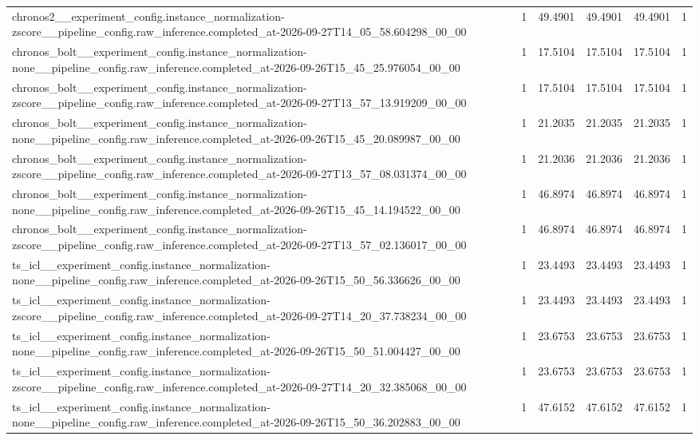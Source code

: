 \begin{tabular}{llllll}
chronos2\_\_experiment\_config.instance\_normalization-zscore\_\_pipeline\_config.raw\_inference.completed\_at-2026-09-27T14\_05\_58.604298\_00\_00 & 1 & 49.4901 & 49.4901 & 49.4901 & 1 \\
chronos\_bolt\_\_experiment\_config.instance\_normalization-none\_\_pipeline\_config.raw\_inference.completed\_at-2026-09-26T15\_45\_25.976054\_00\_00 & 1 & 17.5104 & 17.5104 & 17.5104 & 1 \\
chronos\_bolt\_\_experiment\_config.instance\_normalization-zscore\_\_pipeline\_config.raw\_inference.completed\_at-2026-09-27T13\_57\_13.919209\_00\_00 & 1 & 17.5104 & 17.5104 & 17.5104 & 1 \\
chronos\_bolt\_\_experiment\_config.instance\_normalization-none\_\_pipeline\_config.raw\_inference.completed\_at-2026-09-26T15\_45\_20.089987\_00\_00 & 1 & 21.2035 & 21.2035 & 21.2035 & 1 \\
chronos\_bolt\_\_experiment\_config.instance\_normalization-zscore\_\_pipeline\_config.raw\_inference.completed\_at-2026-09-27T13\_57\_08.031374\_00\_00 & 1 & 21.2036 & 21.2036 & 21.2036 & 1 \\
chronos\_bolt\_\_experiment\_config.instance\_normalization-none\_\_pipeline\_config.raw\_inference.completed\_at-2026-09-26T15\_45\_14.194522\_00\_00 & 1 & 46.8974 & 46.8974 & 46.8974 & 1 \\
chronos\_bolt\_\_experiment\_config.instance\_normalization-zscore\_\_pipeline\_config.raw\_inference.completed\_at-2026-09-27T13\_57\_02.136017\_00\_00 & 1 & 46.8974 & 46.8974 & 46.8974 & 1 \\
ts\_icl\_\_experiment\_config.instance\_normalization-none\_\_pipeline\_config.raw\_inference.completed\_at-2026-09-26T15\_50\_56.336626\_00\_00 & 1 & 23.4493 & 23.4493 & 23.4493 & 1 \\
ts\_icl\_\_experiment\_config.instance\_normalization-zscore\_\_pipeline\_config.raw\_inference.completed\_at-2026-09-27T14\_20\_37.738234\_00\_00 & 1 & 23.4493 & 23.4493 & 23.4493 & 1 \\
ts\_icl\_\_experiment\_config.instance\_normalization-none\_\_pipeline\_config.raw\_inference.completed\_at-2026-09-26T15\_50\_51.004427\_00\_00 & 1 & 23.6753 & 23.6753 & 23.6753 & 1 \\
ts\_icl\_\_experiment\_config.instance\_normalization-zscore\_\_pipeline\_config.raw\_inference.completed\_at-2026-09-27T14\_20\_32.385068\_00\_00 & 1 & 23.6753 & 23.6753 & 23.6753 & 1 \\
ts\_icl\_\_experiment\_config.instance\_normalization-none\_\_pipeline\_config.raw\_inference.completed\_at-2026-09-26T15\_50\_36.202883\_00\_00 & 1 & 47.6152 & 47.6152 & 47.6152 & 1 \\

\end{tabular}
